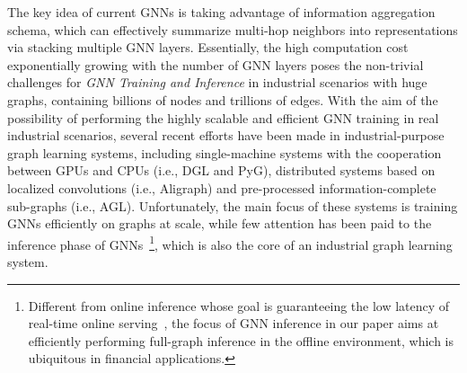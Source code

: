 \documentclass[conference]{IEEEtran}
\begin{document}
The key idea of current GNNs is taking advantage of information aggregation schema, which can effectively summarize multi-hop neighbors into representations via stacking multiple GNN layers. Essentially,  the high computation cost exponentially growing with the number of GNN layers poses the non-trivial challenges for \emph{GNN Training and Inference} in industrial scenarios with huge graphs, containing billions
of nodes and trillions of edges. With the aim of the possibility of performing the highly scalable and efficient GNN training in real industrial scenarios, several recent efforts have been made in industrial-purpose graph learning systems, including single-machine systems with the cooperation between GPUs and CPUs (i.e., DGL\cite{b13,b14} and PyG\cite{b15}), distributed systems based on localized convolutions (i.e.,  Aligraph\cite{b16}) and pre-processed information-complete sub-graphs (i.e., AGL\cite{b17}). Unfortunately, the main focus of these systems is training GNNs efficiently on graphs at scale, while few attention has been paid to the inference phase of GNNs~\footnote{Different from online inference whose goal is guaranteeing the low latency of real-time online serving~\cite{aab17,aab18}, the focus of GNN inference in our paper aims at efficiently performing full-graph inference in the offline environment, which is ubiquitous in financial applications.}, which is also the core of an industrial graph learning system.


\end{document}
